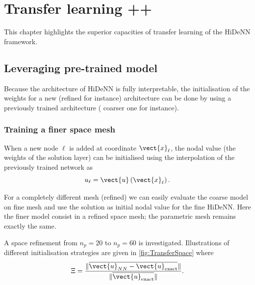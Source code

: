 \chapter[Transfer learning ++]{Transfer learning ++}
\label{chap:Transfer_learning}
\begin{chapabstract}
    This chapter highlights the superior capacities of transfer learning of the HiDeNN framework.
\end{chapabstract}

\minitoc

\section{Leveraging pre-trained model}

Because the architecture of HiDeNN is fully interpretable, the initialisation of the weights for a new (refined for instance) architecture can be done by using a previously trained architecture ( coarser one for instance).


\subsection{Training a finer space mesh}

When a new node $\ell$ is added at coordinate $\vect{x}_{\ell}$, the nodal value (the weights of the solution layer) can be initialised using the interpolation of the previously trained network as
\begin{equation}
    u_{\ell} = \vect{u}\left(\vect{x}_{\ell}\right).
\end{equation}

For a completely different mesh (refined) we can easily evaluate the coarse model on fine mesh and use the solution as initial nodal value for the fine HiDeNN. Here the finer model consist in a refined space mesh; the parametric mesh remains exactly the same.

A space refinement from $n_p = 20$ to $n_p = 60$ is investigated.
Illustrations of different initialisation strategies are given in \cref{fig:TransferSpace} where 
\begin{equation}
    \Xi = \frac{\Vert\overline{ \vect{u}_{NN}-\vect{u}_{\text{exact}}}\Vert}{\Vert\overline{ \vect{u}_{\text{exact}}}\Vert}.
\end{equation}

